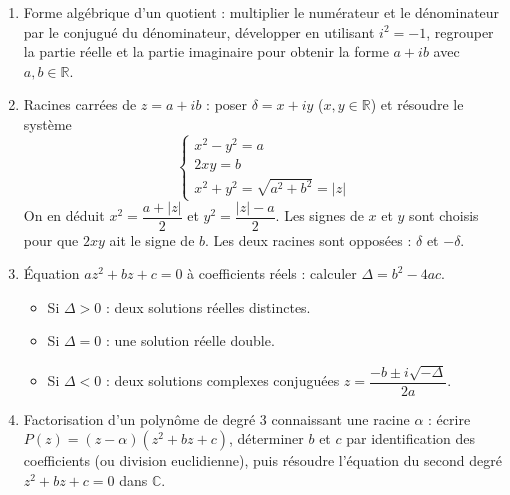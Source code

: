 \documentclass[11pt]{article}
\newcommand{\cle}[1]{{\popxbold\color{popdark}#1}}
\begin{document}
\begin{methode}
\begin{enumerate}
  \item \cle{Forme algébrique d'un quotient} : multiplier le numérateur et le dénominateur par le conjugué du dénominateur, développer en utilisant $i^2=-1$, regrouper la partie réelle et la partie imaginaire pour obtenir la forme $a+ib$ avec $a,b\in\mathbb{R}$.
  \item \cle{Racines carrées de $z=a+ib$} : poser $\delta=x+iy$ ($x,y\in\mathbb{R}$) et résoudre le système
  \[
  \begin{cases}
  x^2-y^2=a \\
  2xy=b \\
  x^2+y^2=\sqrt{a^2+b^2}=|z|
  \end{cases}
  \]
  On en déduit $x^2=\dfrac{a+|z|}{2}$ et $y^2=\dfrac{|z|-a}{2}$. Les signes de $x$ et $y$ sont choisis pour que $2xy$ ait le signe de $b$. Les deux racines sont opposées : $\delta$ et $-\delta$.
  \item \cle{Équation $az^2+bz+c=0$ à coefficients réels} : calculer $\Delta=b^2-4ac$.
  \begin{itemize}
    \item Si $\Delta>0$ : deux solutions réelles distinctes.
    \item Si $\Delta=0$ : une solution réelle double.
    \item Si $\Delta<0$ : deux solutions complexes conjuguées $z=\dfrac{-b\pm i\sqrt{-\Delta}}{2a}$.
  \end{itemize}
  \item \cle{Factorisation d'un polynôme de degré 3} connaissant une racine $\alpha$ : écrire $P(z)=(z-\alpha)(z^2+bz+c)$, déterminer $b$ et $c$ par identification des coefficients (ou division euclidienne), puis résoudre l'équation du second degré $z^2+bz+c=0$ dans $\mathbb{C}$.
\end{enumerate}
\end{methode}
\end{document}
